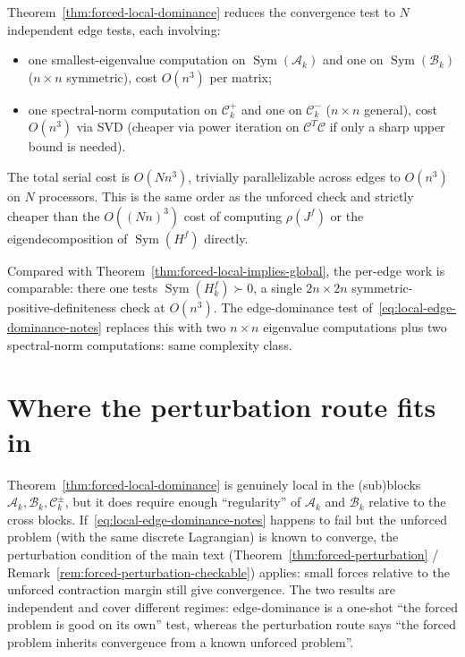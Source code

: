 \documentclass{article}
\newcommand{\Sym}{\operatorname{Sym}}
\begin{document}
Theorem~\ref{thm:forced-local-dominance} reduces the convergence test to
$N$ independent edge tests, each involving:
\begin{itemize}
    \item one smallest-eigenvalue computation on $\Sym(\mathcal{A}_k)$ and one
          on $\Sym(\mathcal{B}_k)$ ($n \times n$ symmetric), cost $O(n^3)$ per matrix;
    \item one spectral-norm computation on $\mathcal{C}^+_k$ and one on
          $\mathcal{C}^-_k$ ($n \times n$ general), cost $O(n^3)$ via SVD
          (cheaper via power iteration on $\mathcal{C}^T \mathcal{C}$ if only a
          sharp upper bound is needed).
\end{itemize}
The total serial cost is $O(N n^3)$, trivially parallelizable across edges to
$O(n^3)$ on $N$ processors. This is the same order as the unforced check and
strictly cheaper than the $O((Nn)^3)$ cost of computing $\rho(J^f)$ or the
eigendecomposition of $\Sym(H^f)$ directly.

Compared with Theorem~\ref{thm:forced-local-implies-global}, the per-edge work
is comparable: there one tests $\Sym(H_k^f) \succ 0$, a single $2n \times 2n$
symmetric-positive-definiteness check at $O(n^3)$. The edge-dominance test
of~\eqref{eq:local-edge-dominance-notes} replaces this with two $n \times n$
eigenvalue computations plus two spectral-norm computations: same complexity
class.

\section{Where the perturbation route fits in}

Theorem~\ref{thm:forced-local-dominance} is genuinely local in the (sub)blocks
$\mathcal{A}_k, \mathcal{B}_k, \mathcal{C}^\pm_k$, but it does require enough
``regularity'' of $\mathcal{A}_k$ and $\mathcal{B}_k$ relative to the cross
blocks. If~\eqref{eq:local-edge-dominance-notes} happens to fail but the
unforced problem (with the same discrete Lagrangian) is known to converge, the
perturbation condition of the main text
(Theorem~\ref{thm:forced-perturbation} / Remark~\ref{rem:forced-perturbation-checkable})
applies: small forces relative to the unforced contraction margin still give
convergence. The two results are independent and cover different regimes:
edge-dominance is a one-shot ``the forced problem is good on its own'' test,
whereas the perturbation route says ``the forced problem inherits convergence
from a known unforced problem''.
\end{document}
